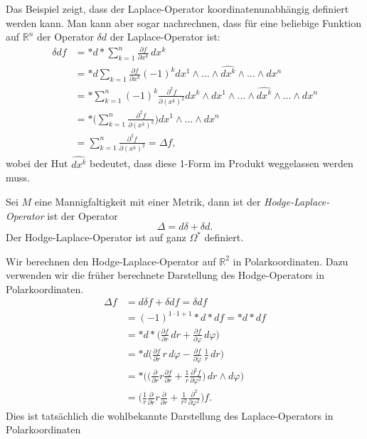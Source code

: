 Das Beispiel zeigt, dass der Laplace-Operator koordinatenunabhängig
definiert werden kann.
Man kann aber sogar nachrechnen, dass für eine beliebige Funktion
auf $\mathbb{R}^n$ der Operator $\delta d$ der Laplace-Operator
ist:
\begin{align*}
\delta d f
&=
{\ast}d{\ast}\sum_{k=1}^n \frac{\partial f}{\partial x^k}\,dx^k
\\
&=
{\ast}d\sum_{k=1} \frac{\partial f}{\partial x^k}
(-1)^k
dx^1\wedge\dots\wedge \widehat{dx^k}\wedge\dots\wedge dx^n
\\
&=
{\ast}
\sum_{k=1}^n
(-1)^k
\frac{\partial^2 f}{\partial (x^k)^2}
dx^k\wedge dx^1\wedge\dots\wedge\widehat{dx^k}\wedge\dots\wedge dx^n
\\
&=
{\ast}
\biggl(
\sum_{k=1}^n
\frac{\partial^2 f}{\partial (x^k)^2}
\biggr)
dx^1\wedge\dots\wedge dx^n
\\
&=
\sum_{k=1}^n \frac{\partial^2 f}{\partial (x^k)^2}
=
\Delta f,
\end{align*}
wobei der Hut $\widehat{dx^k}$ bedeutet, dass diese 1-Form im
Produkt weggelassen werden muss.

\begin{definition}
Sei $M$ eine Mannigfaltigkeit mit einer Metrik, dann ist
der {\em Hodge-Laplace-Operator} ist der Operator
%
\[
\Delta = d\delta + \delta d.
\]
Der Hodge-Laplace-Operator ist auf ganz $\Omega^*$ definiert.
\end{definition}

\begin{beispiel}
Wir berechnen den Hodge-Laplace-Operator auf $\mathbb{R}^2$ in
Polarkoordinaten.
Dazu verwenden wir die früher berechnete Darstellung des Hodge-Operators
in Polarkoordinaten.
\begin{align*}
\Delta f
&=
d\delta f
+
\delta d f
=
\delta d f
\\
&=
(-1)^{1\cdot 1+1}
{\ast}d{\ast}d f
=
{\ast}d{\ast}d f
\\
&=
{\ast}d{\ast}
\biggl(
\frac{\partial f}{\partial r}\,dr
+
\frac{\partial f}{\partial \varphi}\,d\varphi
\biggr)
\\
&=
{\ast}d\biggl(
\frac{\partial f}{\partial r}\,r\,d\varphi
-
\frac{\partial f}{\partial \varphi}\,\frac{1}{r}\,dr
\biggr)
\\
&=
{\ast}
\biggl(
\biggl(
\frac{\partial }{\partial r} r \frac{\partial f}{\partial r}
+
\frac{1}{r}
\frac{\partial^2 f}{\partial\varphi^2}
\biggr)
\,dr\wedge d\varphi
\biggr)
\\
&=
\biggl(
\frac{1}{r}
\frac{\partial}{\partial r} 
r
\frac{\partial}{\partial r}
+
\frac{1}{r^2}
\frac{\partial^2}{\partial \varphi^2}
\biggr)
f.
\end{align*}
Dies ist tatsächlich die wohlbekannte Darstellung des
Laplace-Operators in Polarkoordinaten
\end{beispiel}


